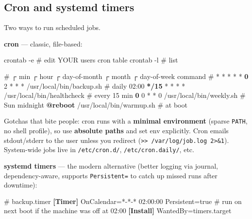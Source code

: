 \documentclass[11pt]{article}
\newenvironment{Shaded}{\begin{snugshade}}{\end{snugshade}}
\newcommand{\AttributeTok}[1]{\textcolor[rgb]{0.16,0.50,0.73}{#1}}
\newcommand{\CommentTok}[1]{\textcolor[rgb]{0.48,0.49,0.49}{#1}}
\newcommand{\DataTypeTok}[1]{\textcolor[rgb]{0.16,0.50,0.73}{#1}}
\newcommand{\ExtensionTok}[1]{\textcolor[rgb]{0.00,0.60,1.00}{\textbf{#1}}}
\newcommand{\FunctionTok}[1]{\textcolor[rgb]{0.56,0.27,0.68}{#1}}
\newcommand{\KeywordTok}[1]{\textcolor[rgb]{0.81,0.81,0.76}{\textbf{#1}}}
\newcommand{\NormalTok}[1]{\textcolor[rgb]{0.81,0.81,0.76}{#1}}
\newcommand{\OtherTok}[1]{\textcolor[rgb]{0.15,0.68,0.38}{#1}}
\newcommand{\PreprocessorTok}[1]{\textcolor[rgb]{0.15,0.68,0.38}{#1}}
\newcommand{\StringTok}[1]{\textcolor[rgb]{0.96,0.31,0.31}{#1}}
\begin{document}
\subsection{Cron and systemd timers}\label{cron-and-systemd-timers}

Two ways to run scheduled jobs.

\textbf{cron} --- classic, file-based:


\begin{Shaded}
\begin{Highlighting}[]
\FunctionTok{crontab} \AttributeTok{{-}e}        \CommentTok{\# edit YOUR user\textquotesingle{}s cron table}
\FunctionTok{crontab} \AttributeTok{{-}l}        \CommentTok{\# list}

\CommentTok{\# ┌ min  ┌ hour ┌ day{-}of{-}month ┌ month ┌ day{-}of{-}week    command}
\CommentTok{\# *      *      *              *       *}
  \ExtensionTok{0}\NormalTok{      2      }\PreprocessorTok{*}              \PreprocessorTok{*}       \PreprocessorTok{*}\NormalTok{     /usr/local/bin/backup.sh   }\CommentTok{\# daily 02:00}
  \ExtensionTok{*/15}   \PreprocessorTok{*}      \PreprocessorTok{*}              \PreprocessorTok{*}       \PreprocessorTok{*}\NormalTok{     /usr/local/bin/healthcheck }\CommentTok{\# every 15 min}
  \ExtensionTok{0}\NormalTok{      0      }\PreprocessorTok{*}              \PreprocessorTok{*}\NormalTok{       0     /usr/local/bin/weekly.sh   }\CommentTok{\# Sun midnight}
  \ExtensionTok{@reboot}\NormalTok{                                    /usr/local/bin/warmup.sh   }\CommentTok{\# at boot}
\end{Highlighting}
\end{Shaded}

Gotchas that bite people: cron runs with a \textbf{minimal environment} (sparse \texttt{PATH}, no shell profile), so use \textbf{absolute paths} and set env explicitly. Cron emails stdout/stderr to the user unless you redirect (\texttt{\textgreater{}\textgreater{}\ /var/log/job.log\ 2\textgreater{}\&1}). System-wide jobs live in \texttt{/etc/cron.d/}, \texttt{/etc/cron.daily/}, etc.

\textbf{systemd timers} --- the modern alternative (better logging via journal, dependency-aware, supports \texttt{Persistent=} to catch up missed runs after downtime):


\begin{Shaded}
\begin{Highlighting}[]
\CommentTok{\# backup.timer}
\KeywordTok{[Timer]}
\DataTypeTok{OnCalendar}\OtherTok{=}\StringTok{*{-}*{-}* 02:00:00}
\DataTypeTok{Persistent}\OtherTok{=}\StringTok{true            \# run on next boot if the machine was off at 02:00}
\KeywordTok{[Install]}
\DataTypeTok{WantedBy}\OtherTok{=}\StringTok{timers.target}
\end{Highlighting}
\end{Shaded}
\end{document}

